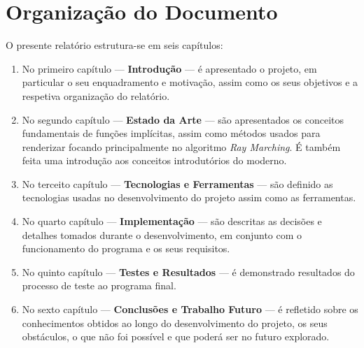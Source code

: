 \section{Organização do Documento}
\label{sec::intro:orgdoc}

O presente relatório estrutura-se em seis capítulos:

\begin{enumerate}
	\item No primeiro capítulo --- \textbf{Introdução} --- é apresentado o projeto, em particular o seu enquadramento e motivação, assim como os seus objetivos e a respetiva organização do relatório.
	
	\item No segundo capítulo --- \textbf{Estado da Arte} \revision{} --- são apresentados os conceitos fundamentais de funções implícitas, assim como métodos usados para renderizar focando principalmente no algoritmo \textit{Ray Marching}. É também feita uma introdução aos conceitos introdutórios do \opengl moderno.
	
	\item No terceito capítulo --- \textbf{Tecnologias e Ferramentas} \revision{} --- são definido as tecnologias usadas no desenvolvimento do projeto assim como as ferramentas.
	
	\item No quarto capítulo --- \textbf{Implementação} \revision{} --- são descritas as decisões e detalhes tomados durante o desenvolvimento, em conjunto com o funcionamento do programa e os seus requisitos.
	
	\item No quinto capítulo --- \textbf{Testes e Resultados} \revision{} --- é demonstrado resultados do processo de teste ao programa final.
	
	\item No sexto capítulo --- \textbf{Conclusões e Trabalho Futuro} \revision{} --- é refletido sobre os conhecimentos obtidos ao longo do desenvolvimento do projeto, os seus obstáculos, o que não foi possível e que poderá ser no futuro explorado.
\end{enumerate}
